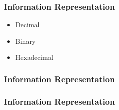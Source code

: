 \begin{frame}
    \frametitle{Information Representation}
    \begin{itemize}
        \item Decimal
        \item Binary
        \item Hexadecimal
    \end{itemize}
    \note{
    }
\end{frame}

\begin{frame}
    \frametitle{Information Representation}

    \begin{table}[h!]
        \centering
        \caption{Decimal, Binary, and Hexadecimal Values}
        \label{tab:binary_decimal_hexadecimal}
    \end{table}

    \note{
    }
\end{frame}


\begin{frame}
    \frametitle{Information Representation}
\end{frame}

